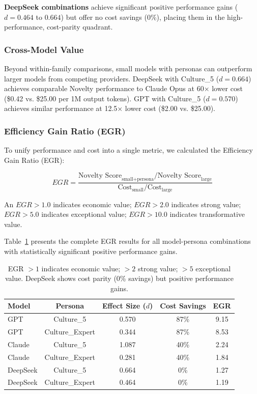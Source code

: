 \documentclass{article}
\begin{document}
\textbf{DeepSeek combinations} achieve significant positive performance gains ($d = 0.464$ to $0.664$) but offer no cost savings (0\%), placing them in the high-performance, cost-parity quadrant.

\subsubsection{Cross-Model Value}

Beyond within-family comparisons, small models with personas can outperform larger models from competing providers. DeepSeek with Culture\_5 ($d = 0.664$) achieves comparable Novelty performance to Claude Opus at 60× lower cost (\$0.42 vs. \$25.00 per 1M output tokens). GPT with Culture\_5 ($d = 0.570$) achieves similar performance at 12.5× lower cost (\$2.00 vs. \$25.00).

\subsubsection{Efficiency Gain Ratio (EGR)}

To unify performance and cost into a single metric, we calculated the Efficiency Gain Ratio (EGR):

\begin{equation}
EGR = \frac{\text{Novelty Score}_{\text{small+persona}} / \text{Novelty Score}_{\text{large}}}{\text{Cost}_{\text{small}} / \text{Cost}_{\text{large}}}
\end{equation}

An $EGR > 1.0$ indicates economic value; $EGR > 2.0$ indicates strong value; $EGR > 5.0$ indicates exceptional value; $EGR > 10.0$ indicates transformative value.

Table~\ref{tab:egr_complete} presents the complete EGR results for all model-persona combinations with statistically significant positive performance gains.

\begin{table}[H]
\centering
\caption{Complete EGR Results for Novelty (Positive Combinations)}
\label{tab:egr_complete}
\begin{tabular}{lcccc}
\toprule
Model & Persona & Effect Size ($d$) & Cost Savings & EGR \\
\midrule
GPT & Culture\_5 & 0.570 & 87\% & 9.15 \\
GPT & Culture\_Expert & 0.344 & 87\% & 8.53 \\
Claude & Culture\_5 & 1.087 & 40\% & 2.24 \\
Claude & Culture\_Expert & 0.281 & 40\% & 1.84 \\
DeepSeek & Culture\_5 & 0.664 & 0\% & 1.27 \\
DeepSeek & Culture\_Expert & 0.464 & 0\% & 1.19 \\
\bottomrule
\end{tabular}
\caption*{\footnotesize EGR $> 1$ indicates economic value; $> 2$ strong value; $> 5$ exceptional value. DeepSeek shows cost parity (0\% savings) but positive performance gains.}
\end{table}
\end{document}
